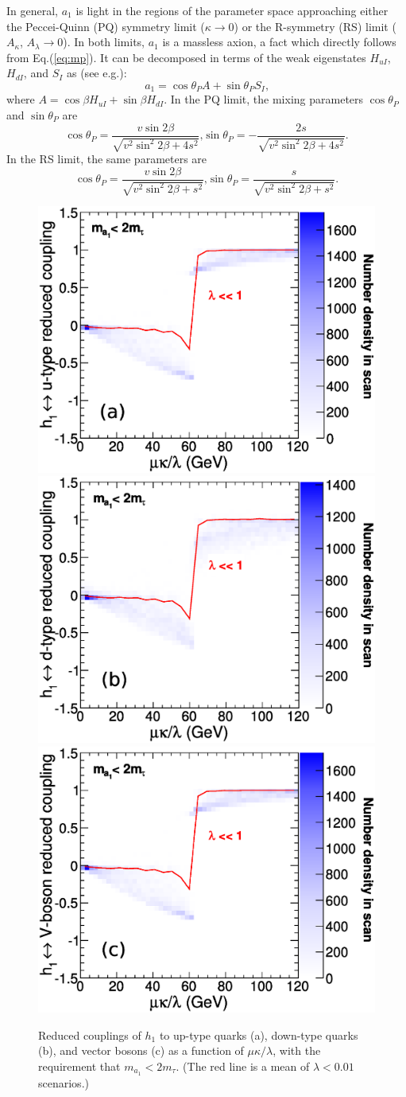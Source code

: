 \documentclass[aps,prl,twocolumn,nofootinbib,superscriptaddress]{revtex4}
\begin{document}
In general, $a_1$ is light in the regions of the parameter space
approaching either the Peccei-Quinn (PQ) symmetry limit ($\kappa \to
0$) or the R-symmetry (RS) limit ($A_\kappa$, $A_\lambda \to 0$).  In
both limits, $a_1$ is a massless axion, a fact which directly follows
from Eq.(\ref{eq:mp}).  It can be decomposed in terms of the weak
eigenstates $H_{uI}$, $H_{dI}$, and $S_I$ as (see
e.g.\cite{Ellwanger:2009dp}):
\begin{equation}
a_1 = \cos\theta_P A + \sin\theta_P S_I\mbox{,}
\end{equation}
where $A = \cos\beta H_{uI} + \sin\beta H_{dI}$.  In the PQ limit,
the mixing parameters $\cos\theta_P$ and $\sin\theta_P$ are
\begin{equation}
\cos \theta_P = \frac{v \sin 2\beta}{\sqrt{v^2\sin^2 2\beta + 4 s^2}}\mbox{,}
\sin \theta_P = -\frac{2s}{\sqrt{v^2\sin^2 2\beta + 4 s^2}}\mbox{.}
\label{eq:pqmix}
\end{equation}
In the RS limit, the same parameters are
\begin{equation}
\cos \theta_P = \frac{v \sin 2\beta}{\sqrt{v^2\sin^2 2\beta + s^2}}\mbox{,}
\sin \theta_P = \frac{s}{\sqrt{v^2\sin^2 2\beta + s^2}}\mbox{.}
\label{eq:rsmix}
\end{equation}

\begin{figure}[thb]
\includegraphics[width=0.32\linewidth]{cu1_vs_mkoverl}
\hfill
\includegraphics[width=0.32\linewidth]{cd1_vs_mkoverl}
\hfill
\includegraphics[width=0.32\linewidth]{cv1_vs_mkoverl}

\caption{Reduced couplings of $h_1$ to up-type quarks (a), down-type
  quarks (b), and vector bosons (c) as a function of $\mu\kappa/\lambda$, with
  the requirement that $m_{a_1} < 2m_\tau$.  (The red line is a mean
  of $\lambda < 0.01$ scenarios.) \label{fig:sm_mukoverl1}}
\end{figure}
\end{document}
